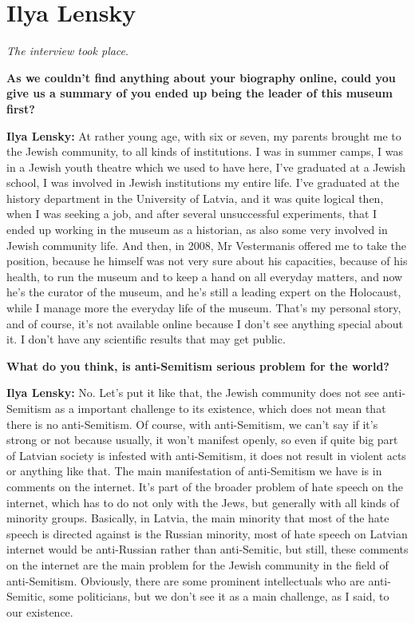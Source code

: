 \section{Ilya Lensky}

\textit{The interview took place}.\par
\vspace*{2em}
\textbf{ As we couldn’t find anything about your biography online, could you give us a summary of you ended up being the leader of this museum first?}

\textbf{Ilya Lensky:} At rather young age, with six or seven, my parents brought me to the Jewish community, to all kinds of institutions. I was in summer camps, I was in a Jewish youth theatre which we used to have here, I’ve graduated at a Jewish school, I was involved in Jewish institutions my entire life. I’ve graduated at the history department in the University of Latvia, and it was quite logical then, when I was seeking a job, and after several unsuccessful experiments, that I ended up working in the museum as a historian, as also some very involved in Jewish community life. And then, in 2008, Mr Vestermanis offered me to take the position, because he himself was not very sure about his capacities, because of his health, to run the museum and to keep a hand on all everyday matters, and now he’s the curator of the museum, and he’s still a leading expert on the Holocaust, while I manage more the everyday life of the museum. That’s my personal story, and of course, it’s not available online because I don’t see anything special about it. I don’t have any scientific results that may get public. 

\textbf{What do you think, is anti-Semitism serious problem for the world?}

\textbf{Ilya Lensky:} No. Let’s put it like that, the Jewish community does not see anti-Semitism as a important challenge to its existence, which does not mean that there is no anti-Semitism. Of course, with anti-Semitism, we can’t say if it’s strong or not because usually, it won’t manifest openly, so even if quite big part of Latvian society is infested with anti-Semitism, it does not result in violent acts or anything like that. The main manifestation of anti-Semitism we have is in comments on the internet. It’s part of the broader problem of hate speech on the internet, which has to do not only with the Jews, but generally with all kinds of minority groups. Basically, in Latvia, the main minority that most of the hate speech is directed against is the Russian minority, most of hate speech on Latvian internet would be anti-Russian rather than anti-Semitic, but still, these comments on the internet are the main problem for the Jewish community in the field of anti-Semitism. Obviously, there are some prominent intellectuals who are anti-Semitic, some politicians, but we don’t see it as a main challenge, as I said, to our existence. 

